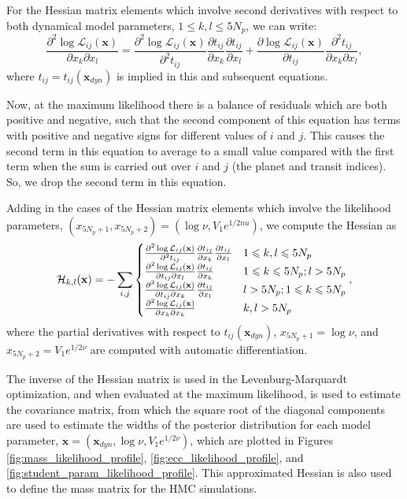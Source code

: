 \documentclass[fleqn,usenatbib]{mnras} %
\begin{document}
For the Hessian matrix elements which involve second derivatives with respect to both dynamical model parameters, $1 \le k,l \le 5N_p$, we can write: 
\begin{equation}
    \frac{\partial^2 \log\mathcal{L}_{ij}(\mathbf{x})}{\partial x_k \partial x_l} = \frac{\partial^2 \log\mathcal{L}_{ij}(\mathbf{x})}{\partial^2 t_{ij}} \frac{\partial t_{ij}}{\partial x_k} \frac{\partial t_{ij}}{\partial x_l} + \frac{\partial \log\mathcal{L}_{ij}(\mathbf{x})}{\partial t_{ij}} \frac{\partial^2 t_{ij}}{\partial x_k \partial x_l},
\end{equation}
where $t_{ij} = t_{ij}(\mathbf{x}_{dyn})$ is implied in this and subsequent equations.  

Now, at the maximum likelihood there is a balance of residuals which are both positive and negative, such that the second component of this equation has terms with positive and negative signs for different values of $i$ and $j$. This causes the second term in this equation to average to a small value compared with the first term when the sum is carried out over $i$ and $j$ (the planet and transit indices).  So, we drop the second term in this equation.

Adding in the cases of the Hessian matrix elements which involve the likelihood parameters, $(x_{5N_p+1},x_{5N_p+2}) = (\log \nu, V_1e^{1/2nu})$, we compute the Hessian as
\begin{eqnarray}\label{eqn:hessian}
\mathcal{H}_{k,l}(\mathbf{x})= -\sum_{i,j} 
\begin{cases}
\frac{\partial^2 \log \mathcal{L}_{ij}(\mathbf{x})}{\partial^2 t_{ij}} \frac{\partial t_{ij}}{\partial x_k} \frac{\partial t_{ij}}{\partial x_l} & 1 \le k,l \le 5N_p \cr
 \frac{\partial^2 \log \mathcal{L}_{ij}(\mathbf{x})}{\partial t_{ij} \partial x_l} \frac{\partial t_{ij}}{\partial x_k} & 1 \le k \le 5N_p; l > 5N_p \cr
 \frac{\partial^2 \log \mathcal{L}_{ij}(\mathbf{x})}{\partial t_{ij} \partial x_k} \frac{\partial t_{ij}}{\partial x_l} & l > 5N_p; 1 \le k \le 5N_p \cr
\frac{\partial^2 \log \mathcal{L}_{ij}(\mathbf{x})}{\partial x_k \partial x_k} & k,l > 5N_p
\end{cases},
\end{eqnarray}
where the partial derivatives with respect to $t_{ij}(\mathbf{x}_{dyn})$, $x_{5N_p+1}=\log \nu$, and $x_{5N_p+2} = V_1e^{1/2\nu}$
are computed with automatic differentiation.

The inverse of the Hessian matrix is used in the Levenburg-Marquardt optimization, and when evaluated at the maximum likelihood, is used to estimate the covariance matrix, from which the square root of the diagonal components are used to estimate the widths of the posterior distribution for each model parameter, $\mathbf{x} = (\mathbf{x}_{dyn},\log \nu, V_1 e^{1/2\nu})$, which are plotted in Figures \ref{fig:mass_likelihood_profile}, \ref{fig:ecc_likelihood_profile}, and \ref{fig:student_param_likelihood_profile}.  This approximated Hessian is also used to define the mass matrix for the HMC simulations.
\end{document}
